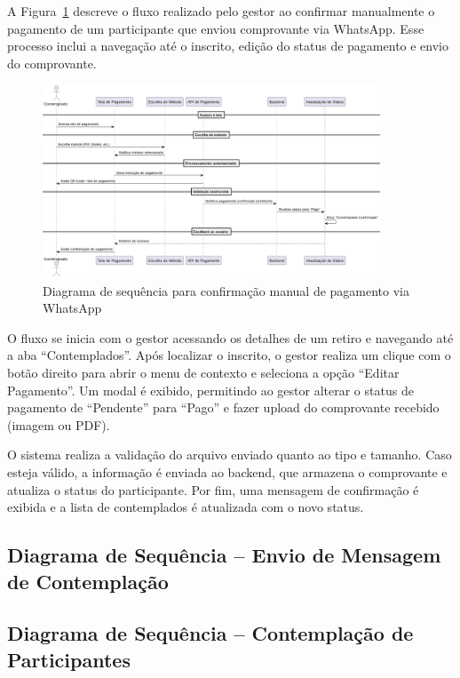 A Figura~\ref{fig:participantPayment} descreve o fluxo realizado pelo gestor ao confirmar manualmente o pagamento de um participante que enviou comprovante via WhatsApp. Esse processo inclui a navegação até o inscrito, edição do status de pagamento e envio do comprovante.

\begin{figure}[H]
    \centering
    \includegraphics[width=0.9\textwidth]{images/diagramasdesequencias/participantPayment.png}
    \caption{Diagrama de sequência para confirmação manual de pagamento via WhatsApp}
    \label{fig:participantPayment}
\end{figure}

O fluxo se inicia com o gestor acessando os detalhes de um retiro e navegando até a aba “Contemplados”. Após localizar o inscrito, o gestor realiza um clique com o botão direito para abrir o menu de contexto e seleciona a opção “Editar Pagamento”. Um modal é exibido, permitindo ao gestor alterar o status de pagamento de “Pendente” para “Pago” e fazer upload do comprovante recebido (imagem ou PDF).

O sistema realiza a validação do arquivo enviado quanto ao tipo e tamanho. Caso esteja válido, a informação é enviada ao backend, que armazena o comprovante e atualiza o status do participante. Por fim, uma mensagem de confirmação é exibida e a lista de contemplados é atualizada com o novo status.

\subsection{Diagrama de Sequência – Envio de Mensagem de Contemplação}

\subsection{Diagrama de Sequência – Contemplação de Participantes}

